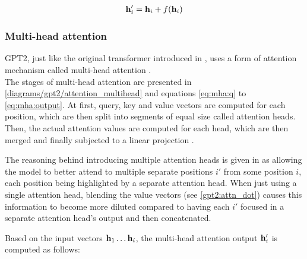 \begin{align}
	{\mathbf{h}}'_i = {\mathbf{h}}_i + f({\mathbf{h}}_i)
	\label{eq:gpt2_res}
\end{align}


\subsubsection{Multi-head attention}
\label{gpt2:attn}

GPT2, just like the original transformer introduced in \cite{allyouneed}, uses a form of attention mechanism called multi-head attention .\\
The stages of multi-head attention are presented in \cref{diagrams/gpt2/attention_multihead} and equations \eqref{eq:mha:q} to \eqref{eq:mha:output}.
At first, query, key and value vectors are computed for each position, which are then split into segments of equal size called attention heads. Then, the actual attention values are computed for each head, which are then merged and finally subjected to a linear projection .

The reasoning behind introducing multiple attention heads is given in  as allowing the model to better attend to multiple separate positions $i'$ from some position $i$, each position being highlighted by a separate attention head. When just using a single attention head, blending the value vectors (see \cref{gpt2:attn_dot}) causes this information to become more diluted compared to having each $i'$ focused in a separate attention head's output and then concatenated.

Based on the input vectors ${\mathbf{h}}_1 \ldots {\mathbf{h}}_i$, the multi-head attention output ${\mathbf{h}}'_i$ is computed as follows: 

